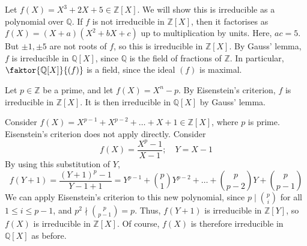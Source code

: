 \begin{example}
    Let \( f(X) = X^3 + 2X + 5 \in \mathbb Z[X] \).
    We will show this is irreducible as a polynomial over \( \mathbb Q \).
    If \( f \) is not irreducible in \( \mathbb Z[X] \), then it factorises as \( f(X) = (X+a)(X^2 + bX + c) \) up to multiplication by units.
    Here, \( ac = 5 \).
    But \( \pm 1, \pm 5 \) are not roots of \( f \), so this is irreducible in \( \mathbb Z[X] \).
    By Gauss' lemma, \( f \) is irreducible in \( \mathbb Q[X] \), since \( \mathbb Q \) is the field of fractions of \( \mathbb Z \).
    In particular, \( \faktor{\mathbb Q[X]}{(f)} \) is a field, since the ideal \( (f) \) is maximal.
\end{example}
\begin{example}
    Let \( p \in \mathbb Z \) be a prime, and let \( f(X) = X^n - p \).
    By Eisenstein's criterion, \( f \) is irreducible in \( \mathbb Z[X] \).
    It is then irreducible in \( \mathbb Q[X] \) by Gauss' lemma.
\end{example}
\begin{example}
    Consider \( f(X) = X^{p-1} + X^{p-2} + \dots + X + 1 \in \mathbb Z[X] \), where \( p \) is prime.
    Eisenstein's criterion does not apply directly.
    Consider
    \[ f(X) = \frac{X^p - 1}{X - 1};\quad Y = X - 1 \]
    By using this substitution of \( Y \),
    \[ f(Y+1) = \frac{(Y+1)^p - 1}{Y-1 + 1} = Y^{p-1} + \binom{p}{1} Y^{p-2} + \dots + \binom{p}{p-2} Y + \binom{p}{p-1} \]
    We can apply Eisenstein's criterion to this new polynomial, since \( p \mid \binom{p}{i} \) for all \( 1 \leq i \leq p - 1 \), and \( p^2 \nmid \binom{p}{p-1} = p \).
    Thus, \( f(Y+1) \) is irreducible in \( \mathbb Z[Y] \), so \( f(X) \) is irreducible in \( \mathbb Z[X] \).
    Of course, \( f(X) \) is therefore irreducible in \( \mathbb Q[X] \) as before.
\end{example}
